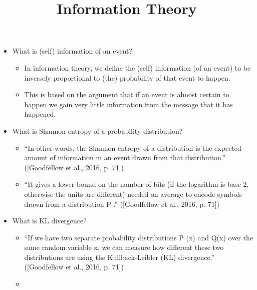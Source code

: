\documentclass{../template/texnote}
\title{Information Theory}
\begin{document}
    \maketitle {}
	\begin{itemize}
		\item 
What is (self) information of an event?
	\begin{itemize}
\item 
    In information theory, we define the (self) information (of an event) to be inversely proportional to (the) probability of that event to happen.
\item 
    This is based on the argument that if an event is almost certain to happen we gain very little information from the message that it has happened.  
	\end{itemize}
\item 
What is Shannon entropy of a probability distribution?
	\begin{itemize}
		\item 
    “In other words, the Shannon entropy of a distribution is the expected amount of information in an event drawn from that distribution.” ([Goodfellow et al., 2016, p. 71])
\item 
    “It gives a lower bound on the number of bits (if the logarithm is base 2, otherwise the units are different) needed on average to encode symbols drawn from a distribution P .” ([Goodfellow et al., 2016, p. 71])
	\end{itemize}
\item 
What is KL divergence?
	\begin{itemize}
		\item 
    “If we have two separate probability distributions P (x) and Q(x) over the same random variable x, we can measure how different these two distributions are using the Kullback-Leibler (KL) divergence.” ([Goodfellow et al., 2016, p. 71])
    \item


\end{itemize}
\end{itemize}
\end{document}
